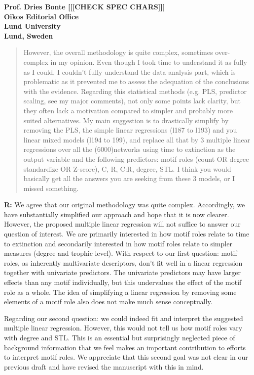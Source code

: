 \documentclass[12pt]{letter}
\begin{document}
\begin{letter}{\bf Prof. Dries Bonte [[[CHECK SPEC CHARS]]]\\
Oikos Editorial Office \\
Lund University \\
Lund, Sweden}
  \begin{quotation}
  However, the overall methodology is quite complex, sometimes over-complex in my opinion. Even though I took time to understand it as fully as I could, I couldn’t fully understand the data analysis part, which is problematic as it prevented me to assess the adequation of the conclusions with the evidence. Regarding this statistical methods (e.g. PLS, predictor scaling, see my major comments), not only some points lack clarity, but they often lack a motivation compared to simpler and probably more suited alternatives. My main suggestion is to drastically simplify by removing the PLS, the simple linear regressions (l187 to l193) and you linear mixed models (l194 to 199), and replace all that by 3 multiple linear regressions over all the (6000)networks using time to extinction as the output variable and the following predictors: motif roles (count OR degree standardize OR Z-score), C, R, C:R, degree, STL. I think you would basically get all the answers you are seeking from these 3 models, or I missed something.
  \end{quotation}


  \textbf{R:} We agree that our original methodology was quite complex. 
  Accordingly, we have substantially simplified our approach and hope that it is now clearer.
  However, the proposed multiple linear regression will not suffice to answer our question of interest. We are primarily interested in how motif roles relate to time to extinction and secondarily interested in how motif roles relate to simpler measures (degree and trophic level). With respect to our first question: motif roles, as inherently multivariate descriptors, don't fit well in a linear regression together with univariate predictors. The univariate predictors may have larger effects than any motif individually, but this undervalues the effect of the motif role as a whole. The idea of simplifying a linear regression by removing some elements of a motif role also does not make much sense conceptually.

  Regarding our second question: we could indeed fit and interpret the suggested multiple linear regression. However, this would not tell us how motif roles vary with degree and STL. This is an essential but surprisingly neglected piece of background information that we feel makes an important contribution to efforts to interpret motif roles.
  We appreciate that this second goal was not clear in our previous draft and have revised the manuscript with this in mind.



\end{letter}
\end{document}
